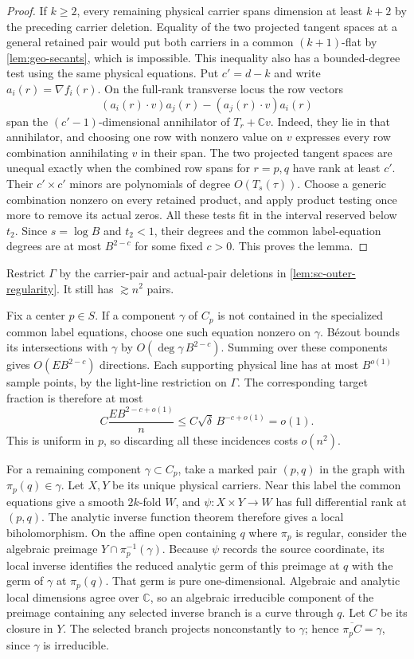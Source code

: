 \begin{proof}
If $k\ge2$, every remaining physical carrier spans dimension at least $k+2$ by the preceding carrier deletion.  Equality of the two projected tangent spaces at a general retained pair would put both carriers in a common $(k+1)$-flat by \cref{lem:geo-secants}, which is impossible.  This inequality also has a bounded-degree test using the same physical equations.  Put $c'=d-k$ and write $a_i(r)=\nabla f_i(r)$.  On the full-rank transverse locus the row vectors
\[
 (a_i(r)\mathbin{\cdot}v)a_j(r)
 -(a_j(r)\mathbin{\cdot}v)a_i(r)
\]
span the $(c'-1)$-dimensional annihilator of $T_r+\mathbb{C}v$. Indeed, they lie in that annihilator, and choosing one row with nonzero value on $v$ expresses every row combination annihilating $v$ in their span.  The two projected tangent spaces are unequal exactly when the combined row spans for $r=p,q$ have rank at least $c'$.  Their $c'\times c'$ minors are polynomials of degree $O(T_s(\tau))$.  Choose a generic combination nonzero on every retained product, and apply product testing once more to remove its actual zeros.  All these tests fit in the interval reserved below $t_2$.  Since $s=\log B$ and $t_2<1$, their degrees and the common label-equation degrees are at most $B^{2-c}$ for some fixed $c>0$.  This proves the lemma.
\end{proof}

Restrict $\Gamma$ by the carrier-pair and actual-pair deletions in \cref{lem:sc-outer-regularity}.  It still has $\gtrsim n^2$ pairs.

Fix a center $p\in S$.  If a component $\gamma$ of $C_p$ is not contained in the specialized common label equations, choose one such equation nonzero on $\gamma$.  B\'ezout bounds its intersections with $\gamma$ by $O(\deg\gamma\,B^{2-c})$.  Summing over these components gives $O(EB^{2-c})$ directions.  Each supporting physical line has at most $B^{o(1)}$ sample points, by the light-line restriction on $\Gamma$. The corresponding target fraction is therefore at most
\[
 C\frac{EB^{2-c+o(1)}}{n}
 \le C\sqrt\delta\,B^{-c+o(1)}=o(1).
\]
This is uniform in $p$, so discarding all these incidences costs $o(n^2)$.

For a remaining component $\gamma\subset C_p$, take a marked pair $(p,q)$ in the graph with $\pi_p(q)\in\gamma$.  Let $X,Y$ be its unique physical carriers.  Near this label the common equations give a smooth $2k$-fold $W$, and $\psi:X\times Y\to W$ has full differential rank at $(p,q)$.  The analytic inverse function theorem therefore gives a local biholomorphism.  On the affine open containing $q$ where $\pi_p$ is regular, consider the algebraic preimage $Y\cap\pi_p^{-1}(\gamma)$. Because $\psi$ records the source coordinate, its local inverse identifies the reduced analytic germ of this preimage at $q$ with the germ of $\gamma$ at $\pi_p(q)$.  That germ is pure one-dimensional.  Algebraic and analytic local dimensions agree over $\mathbb{C}$, so an algebraic irreducible component of the preimage containing any selected inverse branch is a curve through $q$.  Let $C$ be its closure in $Y$.  The selected branch projects nonconstantly to $\gamma$; hence $\overline{\pi_pC}=\gamma$, since $\gamma$ is irreducible.

